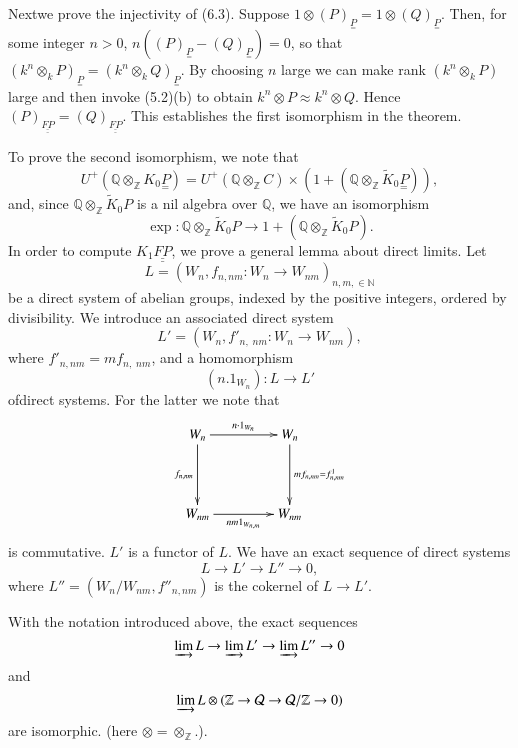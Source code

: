Next\pageoriginale we prove the injectivity of (6.3). Suppose $1 \otimes
(P)_{\underset{=}{P}} = 1 \otimes (Q)_{\underset{=}{P}}$. Then, for
some integer $n > 0$, $n((P)_{\underset{=}{P} } - (Q)_{\underset{=}{P}})
= 0$, so that $(k^n \otimes_k P)_{\underset{=}P} = (k^n \otimes_k
Q)_{\underset{=}{P}}$. By choosing $n$ large we can make rank
$(k^n \otimes _k P)$ large and then invoke (5.2)(b) to obtain $k^n
\otimes P \approx k^n \otimes Q$. Hence $(P)_{\underline{\underline{FP}}} =
(Q)_{\underline{\underline{FP}}}$. This establishes the first
isomorphism in the theorem.   

To prove the second isomorphism, we note that 
$$ 
U^+ (\mathbb{Q} \otimes_{\mathbb{Z}} K_0 \underset{=}{P}) = U^+
(\mathbb{Q} \otimes_{\mathbb{Z}} C) \times (1 + (\mathbb{Q} 
\otimes_{\mathbb{Z}} \tilde{K}_0 \underset{=}{P})),  
$$
and, since $\mathbb{Q} \otimes_{\mathbb{Z}}\tilde{K}_0 P$ is a nil algebra
over $\mathbb{Q}$, we have an isomorphism 
$$
\exp : \mathbb{Q} \otimes_{\mathbb{Z}} \tilde{K}_0 P \to 1 +
(\mathbb{Q} \otimes_{\mathbb{Z}} \tilde{K}_0 P).   
$$
In order to compute $K_1 \underline{\underline{FP}}$, we prove a
general lemma  about direct limits. Let  
$$
L = (W_n, f_{n , nm} : W_n \to W_{nm} )_{n, m, \in \mathbb{N}}   
$$ 
be a direct system of abelian groups, indexed by the positive integers,
ordered by divisibility. We introduce an associated direct system  
$$
L' = (W_n, f'_{ n , \; nm} : W_n \to W_{nm}), 
$$
where $f'_{n, nm} = mf_{n, \; nm}$, and a homomorphism 
$$
(n. 1 _{W_n}) : L \to L' 
$$
of\pageoriginale direct systems. For the latter we note that
\[
\xymatrix@R=1.5cm@C=1.5cm{
W_n \ar[r]^{n\cdot 1_{W_n}} \ar[d]_{f_{n,nm}} & W_n \ar[d]^{mf_{n,nm}
  = f^1_{n,nm}}\\
W_{nm} \ar[r]_{nm1_{W_{n,m}}} & W_{nm}
}
\]
is commutative. $L'$ is a functor of $L$. We have an exact sequence of
direct systems 
\begin{equation*}
L \to L' \to L'' \to 0, \tag{6.4}
\end{equation*}
where $L'' = (W_n / W_{nm}, f''_{n,nm})$ is the cokernel of $L \to
L'$.

\setcounter{lemma}{4}
\begin{lemma}\label{chap1:lem6.5} %
With the notation introduced above, the exact sequences
$$
\varinjlim  L \to \varinjlim L' \to \varinjlim L'' \to 0   
$$
and
$$
\varinjlim L \otimes (\mathbb{Z} \to \mathcal{Q} \to \mathcal{Q} /
\mathbb{Z} \to 0)  
$$
are isomorphic. (here $\otimes = \otimes_{\mathbb{Z}}$.). 
\end{lemma}

